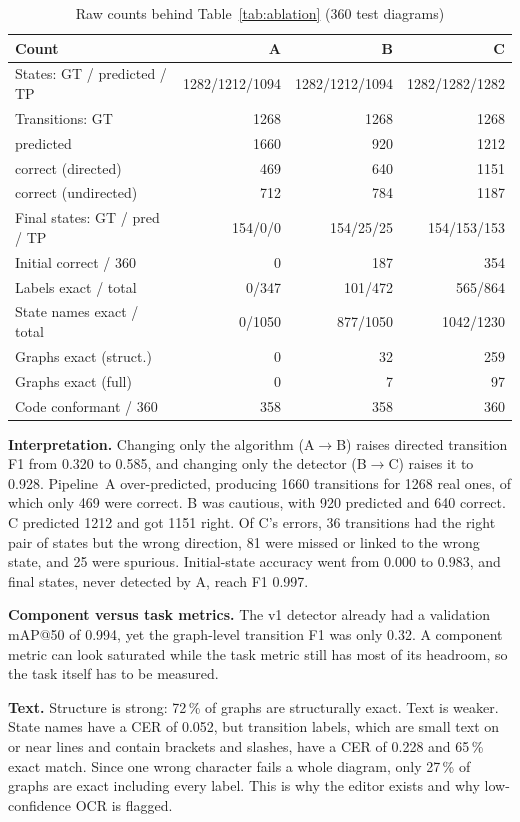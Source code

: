 \documentclass[journal,10pt]{IEEEtran}
\begin{document}
\begin{table}[t]
\centering
\caption{Raw counts behind Table~\ref{tab:ablation} (360 test diagrams)}
\label{tab:counts}
\footnotesize
\begin{tabular}{@{}lrrr@{}}
\toprule
\textbf{Count} & \textbf{A} & \textbf{B} & \textbf{C} \\
\midrule
States: GT / predicted / TP & 1282/1212/1094 & 1282/1212/1094 & 1282/1282/1282 \\
Transitions: GT & 1268 & 1268 & 1268 \\
\quad predicted & 1660 & 920 & 1212 \\
\quad correct (directed) & 469 & 640 & 1151 \\
\quad correct (undirected) & 712 & 784 & 1187 \\
Final states: GT / pred / TP & 154/0/0 & 154/25/25 & 154/153/153 \\
Initial correct / 360 & 0 & 187 & 354 \\
Labels exact / total & 0/347 & 101/472 & 565/864 \\
State names exact / total & 0/1050 & 877/1050 & 1042/1230 \\
Graphs exact (struct.) & 0 & 32 & 259 \\
Graphs exact (full) & 0 & 7 & 97 \\
Code conformant / 360 & 358 & 358 & 360 \\
\bottomrule
\end{tabular}
\end{table}

\textbf{Interpretation.} Changing only the algorithm (A$\rightarrow$B) raises directed
transition F1 from 0.320 to 0.585, and changing only the detector (B$\rightarrow$C) raises
it to 0.928. Pipeline~A over-predicted, producing 1660 transitions for 1268 real ones, of
which only 469 were correct. B was cautious, with 920 predicted and 640 correct. C
predicted 1212 and got 1151 right. Of C's errors, 36 transitions had the right pair of
states but the wrong direction, 81 were missed or linked to the wrong state, and 25 were
spurious. Initial-state accuracy went from 0.000 to 0.983, and final states, never
detected by A, reach F1 0.997.

\textbf{Component versus task metrics.} The v1 detector already had a validation mAP@50 of
0.994, yet the graph-level transition F1 was only 0.32. A component metric can look
saturated while the task metric still has most of its headroom, so the task itself has to
be measured.

\textbf{Text.} Structure is strong: 72\,\% of graphs are structurally exact. Text is
weaker. State names have a CER of 0.052, but transition labels, which are small text on or
near lines and contain brackets and slashes, have a CER of 0.228 and 65\,\% exact match.
Since one wrong character fails a whole diagram, only 27\,\% of graphs are exact including
every label. This is why the editor exists and why low-confidence OCR is flagged.
\end{document}
